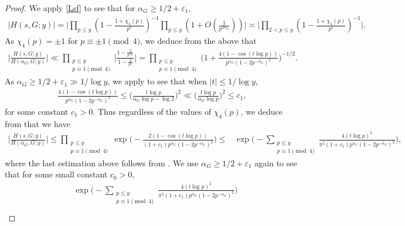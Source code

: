\documentclass[twoside,leqno,10pt, A4]{amsart}
\begin{document}
\begin{proof}
  We apply \eqref{Lsf} to see that for $\alpha_G \geq 1/2+\varepsilon_1$, 
\begin{align*}
  |H(s,G;y)|=\Big|\prod_{p \leq y}(1-\frac {1+\chi_4(p)}{p^s})^{-1}\prod_{p \leq y}(1+O(\frac {1}{p^{2\alpha_G}}))\Big | \asymp \Big|\prod_{2<p \leq y}(1-\frac {1+\chi_4(p)}{p^s})^{-1}\Big|. 
\end{align*}  
  As $\chi_4(p)=\pm 1$ for $p \equiv \pm 1 \pmod 4$, we deduce from the above that
\begin{align*}
  \Big |\frac {H(s,G;y)}{ H(\alpha_G,G;y)} \Big | \ll \prod_{\substack{p \leq y \\ p \equiv 1 \pmod 4}}\Big | \frac {1-\frac {2}{p^{\alpha_G}}}{1-\frac {2}{p^{s}}} \Big | = \prod_{\substack{p \leq y \\ p \equiv 1 \pmod 4}}\Big (1+ \frac {4(1-\cos(t \log p))}{p^{\alpha_G}(1-2p^{-\alpha_G})^{2}} \Big )^{-1/2}. 
\end{align*}
  As $\alpha_G \geq 1/2+\varepsilon_1 \gg 1/\log y$, we apply \cite[(3.11), (3.12)]{HT86} to see that when $|t| \leq 1/\log y$,
\begin{align*}
   \frac {4(1-\cos(t \log p))}{p^{\alpha_G}(1-2p^{-\alpha_G})^{2}} \leq \Big (\frac {t \log p}{\alpha_G\log p-\log 2} \Big )^2 
   \ll \Big (\frac {t \log p}{\alpha_G\log p} \Big )^2 \leq c_1,
\end{align*}  
  for some constant $c_1>0$. Thus regardless of the values of $\chi_4(p)$, we  deduce from \cite[(3.13)]{HT86} that we have
\begin{align*}
  \Big |\frac {H(s,G;y)}{ H(\alpha_G,G;y)} \Big | \leq  \prod_{\substack{p \leq y \\ p \equiv 1 \pmod 4}}\exp\Big (-\frac {2(1-\cos(t \log p))}{(1+c_1)p^{\alpha_G}(1-2p^{-\alpha_G})^{2}} \Big )
  \leq & \exp\Big (-\sum_{\substack{p \leq y \\ p \equiv 1 \pmod 4}}\frac {4(t \log p)^2}{\pi^2(1+c_1)p^{\alpha_G}(1-2p^{-\alpha_G})^{2}} \Big ),
\end{align*}  
   where the last estimation above follows from \cite[(3.11)]{HT86}. We use $\alpha_G \geq 1/2+\varepsilon_1$ again to see that for some small constant $c_0>0$, 
\begin{align*}
 & \exp\Big (-\sum_{\substack{p \leq y \\ p \equiv 1 \pmod 4}}\frac {4(t \log p)^2}{\pi^2(1+c_1)p^{\alpha_G}(1-2p^{-\alpha_G})^{2}} \Big ) \\

\end{align*}
\end{proof}
\end{document}
